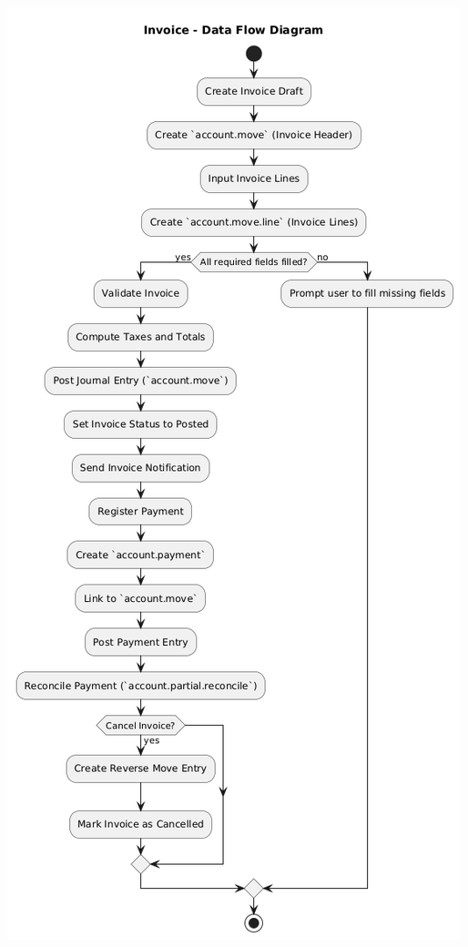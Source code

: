 \documentclass[11pt,a4paper]{article}
\begin{document}
\begin{minipage}{0.4\textwidth}
    \centering
    \includegraphics[width=\linewidth]{diagram/invoice-DFD.png}
\end{minipage}
\end{document}
